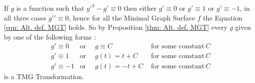 \documentclass[12pt]{article}
\theoremstyle{plain}
\theoremstyle{definition}
\theoremstyle{remark}
\begin{document}
    If \(g\) is a function such that \(g\prime^3-g\prime \equiv 0\) then either \(g\prime \equiv 0\) or \(g\prime \equiv 1\) or \(g\prime \equiv -1\), in all three cases \(g\prime\prime \equiv 0 \), hence for all the Minimal Graph Surface \(f\) the Equation \ref{eqn: Alt. def. MGT} holds. So by Proposition \ref{thm: Alt. def. MGT} every \(g\) given by one of the following forms :
    \begin{align}
    	&g\prime \equiv 0  &\text{or}\,\,\, &g\equiv C \,\, &\text{for some constant}\, C\\
    	&g\prime \equiv 1  &\text{or}\,\,\, &g(t)=t+C \,\,  &\text{for some constant}\, C\\
    	&g\prime \equiv -1 &\text{or}\,\,\, &g(t)=-t+C \,\, &\text{for some constant}\, C
    \end{align}
	is a TMG Transformation.\\
	
\end{document}
